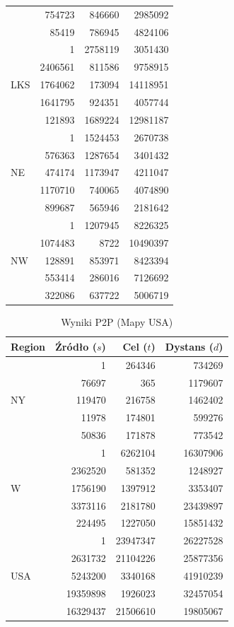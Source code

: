 \documentclass[11pt, a4paper]{article}
\begin{document}
\begin{table}[h!]
\begin{tabular}{lrrr}
		& 754723 & 846660 & 2985092 \\
		& 85419 & 786945 & 4824106 \\
		\midrule
		\multirow{5}{*}{LKS} & 1 & 2758119 & 3051430 \\
		& 2406561 & 811586 & 9758915 \\
		& 1764062 & 173094 & 14118951 \\
		& 1641795 & 924351 & 4057744 \\
		& 121893 & 1689224 & 12981187 \\
		\midrule
		\multirow{5}{*}{NE} & 1 & 1524453 & 2670738 \\
		& 576363 & 1287654 & 3401432 \\
		& 474174 & 1173947 & 4211047 \\
		& 1170710 & 740065 & 4074890 \\
		& 899687 & 565946 & 2181642 \\
		\midrule
		\multirow{5}{*}{NW} & 1 & 1207945 & 8226325 \\
		& 1074483 & 8722 & 10490397 \\
		& 128891 & 853971 & 8423394 \\
		& 553414 & 286016 & 7126692 \\
		& 322086 & 637722 & 5006719 \\
		\midrule
		\bottomrule
	\end{tabular}
\end{table}

\begin{table}[h!]
	\centering
	\caption{Wyniki P2P (Mapy USA)}
	\label{tab:usa_radixs_p2p}
	\vspace{0.2cm}
	\begin{tabular}{lrrr}
		\toprule
		\textbf{Region} & \textbf{Źródło ($s$)} & \textbf{Cel ($t$)} & \textbf{Dystans ($d$)} \\
		\midrule
		\multirow{5}{*}{NY} & 1 & 264346 & 734269 \\
		& 76697 & 365 & 1179607 \\
		& 119470 & 216758 & 1462402 \\
		& 11978 & 174801 & 599276 \\
		& 50836 & 171878 & 773542 \\
		\midrule
		\multirow{5}{*}{W} & 1 & 6262104 & 16307906 \\
		& 2362520 & 581352 & 1248927 \\
		& 1756190 & 1397912 & 3353407 \\
		& 3373116 & 2181780 & 23439897 \\
		& 224495 & 1227050 & 15851432 \\
		\midrule
		\multirow{5}{*}{USA} & 1 & 23947347 & 26227528 \\
		& 2631732 & 21104226 & 25877356 \\
		& 5243200 & 3340168 & 41910239 \\
		& 19359898 & 1926023 & 32457054 \\
		& 16329437 & 21506610 & 19805067 \\
		\midrule
		\bottomrule
	\end{tabular}
\end{table}
\end{document}

